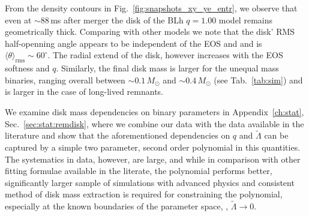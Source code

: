 %
From the density contours in Fig.~\ref{fig:snapshots_xy_ye_entr}, 
we observe that even at ${\sim}88\,$ms after merger the disk
of the BLh $q=1.00$ model remains geometrically thick. 
Comparing with other models we note that 
the disk' \ac{RMS} half-openning angle appears to be independent of the 
\ac{EOS} and \mr{} and is $\langle\theta\rangle_{\text{rms}}\sim60^{\circ}$. 
The radial extend of the disk, however increases with the \ac{EOS} softness and $q$.
%
Similarly, the final disk mass is larger for the unequal mass binaries, 
ranging overall between ${\sim}0.1\,M_{\odot}$ and ${\sim}0.4\,M_{\odot}$
(see Tab.~\ref{tab:sim}) and is larger in the case of long-lived remnants.

%
We examine disk mass dependencies on binary parameters in Appendix~\ref{ch:stat}, 
Sec.~\ref{sec:stat:remdisk}, where we combine our data with the data available in 
the literature and show that the aforementioned dependencies on $q$ and $\tilde{\Lambda}$ 
can be captured by a simple two parameter, second order polynomial in this quantities. 
%
The systematics in data, however, are large, and while in comparison with other fitting 
formulae available in the literate, the polynomial performs better, 
significantly larger sample of simulations with advanced physics and consistent method 
of disk mass extraction is required for constraining the polynomial, especially at the 
known boundaries of the parameter space, \eg, $\tilde{\Lambda}\rightarrow0$.

%
%
%

